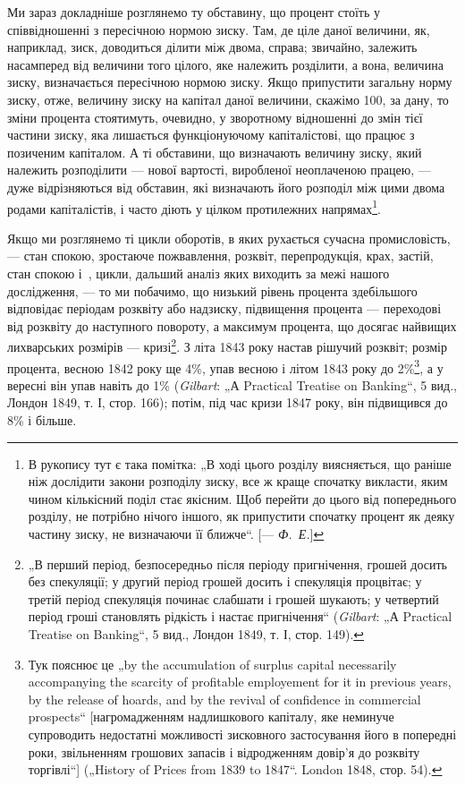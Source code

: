 
Ми зараз докладніше розглянемо ту обставину, що процент
стоїть у співвідношенні з пересічною нормою зиску. Там, де
ціле даної величини, як, наприклад, зиск, доводиться ділити між
двома, справа; звичайно, залежить насамперед від величини того
цілого, яке належить розділити, а вона, величина зиску, визначається
пересічною нормою зиску. Якщо припустити загальну
норму зиску, отже, величину зиску на капітал даної величини,
скажімо \deq{} 100, за дану, то зміни процента стоятимуть, очевидно,
у зворотному відношенні до змін тієї частини зиску, яка лишається
функціонуючому капіталістові, що працює з позиченим
капіталом. А ті обставини, що визначають величину зиску, який
належить розподілити — нової вартості, виробленої неоплаченою
працею, — дуже відрізняються від обставин, які визначають його
розподіл між цими двома родами капіталістів, і часто діють у цілком
протилежних напрямах\footnote{
В рукопису тут є така помітка: „В ході цього розділу виясняється, що
раніше ніж дослідити закони розподілу зиску, все ж краще спочатку викласти,
яким чином кількісний поділ стає якісним. Щоб перейти до цього від попереднього
розділу, не потрібно нічого іншого, як припустити спочатку процент як
деяку частину зиску, не визначаючи її ближче“. [— \emph{Ф.~Е.}]
}.

Якщо ми розглянемо ті цикли оборотів, в яких рухається сучасна
промисловість, — стан спокою, зростаюче пожвавлення, розквіт,
перепродукція, крах, застій, стан спокою і~, цикли,
дальший аналіз яких виходить за межі нашого дослідження, —
то ми побачимо, що низький рівень процента здебільшого відповідає
періодам розквіту або надзиску, підвищення процента —
переходові від розквіту до наступного повороту, а максимум
процента, що досягає найвищих лихварських розмірів — кризі\footnote{
„В перший період, безпосередньо після періоду пригнічення, грошей
досить без спекуляції; у другий період грошей досить і спекуляція процвітає;
у третій період спекуляція починає слабшати і грошей шукають; у четвертий
період гроші становлять рідкість і настає пригнічення“ (\emph{Gilbart}: „А Practical
Treatise on Banking“, 5 вид., Лондон 1849, т. І, стор. 149).
}.
З літа 1843 року настав рішучий розквіт; розмір процента, весною
1842 року ще 4\%, упав весною і літом 1843 року до 2\%\footnote{
Тук пояснює це „by the accumulation of surplus capital necessarily accompanying
the scarcity of profitable employement for it in previous years, by the release
of hoards, and by the revival of confidence in commercial prospects“ [нагромадженням
надлишкового капіталу, яке неминуче супроводить недостатні
можливості зисковного застосування його в попередні роки, звільненням грошових
запасів і відродженням довір’я до розквіту торгівлі“] („History of
Prices from 1839 to 1847“. London 1848, стор. 54).
},
а у вересні він упав навіть до 1\% (\emph{Gilbart}: „А Practical Treatise
on Banking“, 5 вид., Лондон 1849, т. І, стор. 166); потім, під час
кризи 1847 року, він підвищився до 8\% і більше.


